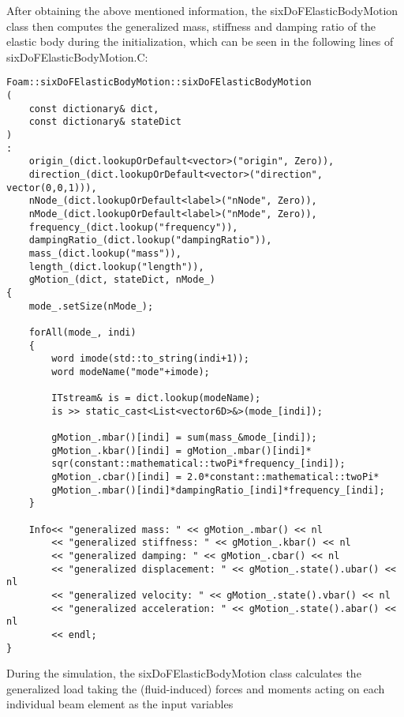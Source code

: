 After obtaining the above mentioned information, the sixDoFElasticBodyMotion class then computes the generalized mass, stiffness and damping ratio of the elastic body during the initialization, which can be seen in the following lines of sixDoFElasticBodyMotion.C:

\begin{lstlisting}
Foam::sixDoFElasticBodyMotion::sixDoFElasticBodyMotion
(
    const dictionary& dict,
    const dictionary& stateDict
)
:
    origin_(dict.lookupOrDefault<vector>("origin", Zero)),
    direction_(dict.lookupOrDefault<vector>("direction", vector(0,0,1))),
    nNode_(dict.lookupOrDefault<label>("nNode", Zero)),
    nMode_(dict.lookupOrDefault<label>("nMode", Zero)),
    frequency_(dict.lookup("frequency")),
    dampingRatio_(dict.lookup("dampingRatio")),
    mass_(dict.lookup("mass")),
    length_(dict.lookup("length")),
    gMotion_(dict, stateDict, nMode_)
{
    mode_.setSize(nMode_);

    forAll(mode_, indi)
    {
        word imode(std::to_string(indi+1));
        word modeName("mode"+imode);

        ITstream& is = dict.lookup(modeName);
        is >> static_cast<List<vector6D>&>(mode_[indi]);

        gMotion_.mbar()[indi] = sum(mass_&mode_[indi]);
        gMotion_.kbar()[indi] = gMotion_.mbar()[indi]*
        sqr(constant::mathematical::twoPi*frequency_[indi]);
        gMotion_.cbar()[indi] = 2.0*constant::mathematical::twoPi*
        gMotion_.mbar()[indi]*dampingRatio_[indi]*frequency_[indi];
    }

    Info<< "generalized mass: " << gMotion_.mbar() << nl
        << "generalized stiffness: " << gMotion_.kbar() << nl
        << "generalized damping: " << gMotion_.cbar() << nl
        << "generalized displacement: " << gMotion_.state().ubar() << nl
        << "generalized velocity: " << gMotion_.state().vbar() << nl
        << "generalized acceleration: " << gMotion_.state().abar() << nl
        << endl;
}
\end{lstlisting}

During the simulation, the sixDoFElasticBodyMotion class calculates the generalized load taking the (fluid-induced) forces and moments acting on each individual beam element as the input variables

